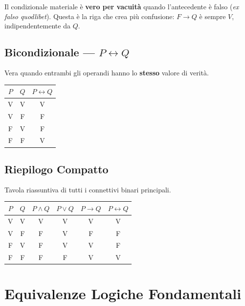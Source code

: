 \documentclass[10pt,a4paper]{article}
\newcommand{\liff}{\leftrightarrow}
\begin{document}
\begin{attenzione}
Il condizionale materiale è \textbf{vero per vacuità} quando l'antecedente è falso
(\textit{ex falso quodlibet}).
Questa è la riga che crea più confusione: $F \to Q$ è sempre $V$, indipendentemente da $Q$.
\end{attenzione}

\subsection{Bicondizionale --- $P \liff Q$}

Vera quando entrambi gli operandi hanno lo \textbf{stesso} valore di verità.

\begin{center}
\renewcommand{\arraystretch}{1.3}
\begin{tabular}{cc|c}
  \toprule
  $P$ & $Q$ & $P \liff Q$ \\
  \midrule
  V & V & V \\
  V & F & F \\
  F & V & F \\
  F & F & V \\
  \bottomrule
\end{tabular}
\end{center}

\subsection{Riepilogo Compatto}

Tavola riassuntiva di tutti i connettivi binari principali.

\begin{center}
\renewcommand{\arraystretch}{1.3}
\begin{tabular}{cc|cccc}
  \toprule
  $P$ & $Q$ & $P \land Q$ & $P \lor Q$ & $P \to Q$ & $P \liff Q$ \\
  \midrule
  V & V & V & V & V & V \\
  V & F & F & V & F & F \\
  F & V & F & V & V & F \\
  F & F & F & F & V & V \\
  \bottomrule
\end{tabular}
\end{center}


\newpage
\section{Equivalenze Logiche Fondamentali}
\end{document}
